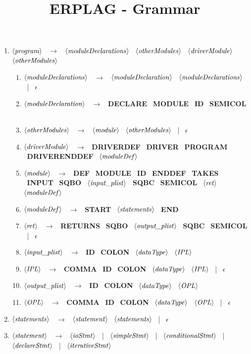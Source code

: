 \documentclass[a4paper]{article}
\title{\textbf{ERPLAG - Grammar}}
\date{}
\newcommand{\nonTerm}[1]{$\left<\text{\textit{#1}}\right>$ \ }
\newcommand{\terminal}[1]{\textbf{\uppercase{#1}} \ }
\newcommand{\ra}[0]{$\rightarrow$ \ }
\newcommand{\eps}[0]{\terminal{$\epsilon$}}
\newcommand{\vertbar}[0]{| \ }
\newcommand{\program}[0]{\nonTerm{program}}
\newcommand{\moduleDeclarations}[0]{\nonTerm{moduleDeclarations}}
\newcommand{\otherModules}[0]{\nonTerm{otherModules}}
\newcommand{\moduleDeclaration}[0]{\nonTerm{moduleDeclaration}}
\newcommand{\driverModule}[0]{\nonTerm{driverModule}}
\newcommand{\module}[0]{\nonTerm{module}}
\newcommand{\moduleDef}[0]{\nonTerm{moduleDef}}
\newcommand{\inputPlist}[0]{\nonTerm{input\_plist}}
\newcommand{\IPL}[0]{\nonTerm{IPL}}
\newcommand{\outputPlist}[0]{\nonTerm{output\_plist}}
\newcommand{\OPL}[0]{\nonTerm{OPL}}
\newcommand{\ret}[0]{\nonTerm{ret}}
\newcommand{\dataType}[0]{\nonTerm{dataType}}
\newcommand{\statements}[0]{\nonTerm{statements}}
\newcommand{\statement}[0]{\nonTerm{statement}}
\newcommand{\ioStmt}[0]{\nonTerm{ioStmt}}
\newcommand{\simpleStmt}[0]{\nonTerm{simpleStmt}}
\newcommand{\declareStmt}[0]{\nonTerm{declareStmt}}
\newcommand{\conditionalStmt}[0]{\nonTerm{conditionalStmt}}
\newcommand{\iterativeStmt}[0]{\nonTerm{iterativeStmt}}
\newcommand{\programTerm}[0]{\terminal{program}}
\newcommand{\id}[0]{\terminal{id}}
\newcommand{\moduleTerm}[0]{\terminal{module}}
\newcommand{\inputTerm}[0]{\terminal{input}}
\newcommand{\driverDefTerm}[0]{\terminal{driverdef}}
\newcommand{\driverEnddef}[0]{\terminal{driverenddef}}
\newcommand{\start}[0]{\terminal{start}}
\renewcommand{\endTerm}[0]{\terminal{end}}
\newcommand{\declare}[0]{\terminal{declare}}
\newcommand{\driver}[0]{\terminal{driver}}
\newcommand{\takes}[0]{\terminal{takes}}
\newcommand{\returns}[0]{\terminal{returns}}
\newcommand{\defTerm}[0]{\terminal{def}}
\renewcommand{\enddef}[0]{\terminal{enddef}}
\newcommand{\colonTerm}[0]{\terminal{colon}}
\newcommand{\semicol}[0]{\terminal{semicol}}
\newcommand{\comma}[0]{\terminal{comma}}
\newcommand{\sqbo}[0]{\terminal{sqbo}}
\newcommand{\sqbc}[0]{\terminal{sqbc}}
\begin{document}
\maketitle

\normalfont

\justify

\begin{enumerate}
    \item \program \ra \moduleDeclarations \otherModules \driverModule \otherModules
    
    \begin{enumerate}
        \item \moduleDeclarations \ra \moduleDeclaration \moduleDeclarations \vertbar \eps 
    
        \item \moduleDeclaration \ra \declare \moduleTerm \id \semicol
        
        \item \otherModules \ra \module \otherModules \vertbar \eps
        
        \item \driverModule \ra \driverDefTerm \driver \programTerm \driverEnddef \moduleDef
        
        \item \module \ra \defTerm \moduleTerm \id \enddef \takes \inputTerm \sqbo \inputPlist \sqbc \semicol \ret \moduleDef
        
        \item \moduleDef \ra \start \statements \endTerm
        
        \item \ret \ra \returns \sqbo \outputPlist \sqbc \semicol \vertbar \eps
        
        \item \inputPlist \ra \id \colonTerm \dataType \IPL
        \item \IPL \ra \comma \id \colonTerm \dataType \IPL \vertbar \eps
        
        \item \outputPlist \ra \id \colonTerm \dataType \OPL
        \item \OPL \ra \comma \id \colonTerm \dataType \OPL \vertbar \eps
    \end{enumerate}
    
    \item \statements \ra \statement \statements \vertbar \eps
    
    \item \statement \ra \ioStmt \vertbar \simpleStmt \vertbar \conditionalStmt \vertbar \declareStmt \vertbar \iterativeStmt
    

\end{enumerate}
\end{document}
